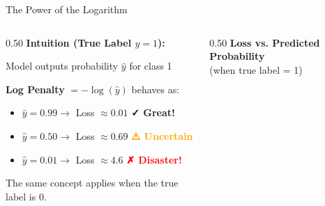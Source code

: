 \begin{frame}{The Power of the Logarithm}
    \begin{columns}[T]
        \begin{column}{0.50\textwidth}
            \textbf{Intuition (True Label $y=1$):}
            \vspace{0.5em}
            
            Model outputs probability $\hat{y}$ for class 1
            
            \vspace{0.5em}
            \textbf{Log Penalty} $= -\log(\hat{y})$ behaves as:
            \begin{itemize}
                \item $\hat{y} = 0.99 \to$ Loss $\approx 0.01$ \textcolor{green!60!black}{\textbf{✓ Great!}}
                \vspace{0.3em}
                \item $\hat{y} = 0.50 \to$ Loss $\approx 0.69$ \textcolor{orange}{\textbf{⚠️ Uncertain}}
                \vspace{0.3em}
                \item $\hat{y} = 0.01 \to$ Loss $\approx 4.6$ \textcolor{red}{\textbf{✗ Disaster!}}
            \end{itemize}
            
            \vspace{1em}
            \begin{tcolorbox}[colback=yellow!10, colframe=orange, boxsep=4pt]
                The same concept applies when the true label is 0.
            \end{tcolorbox}
        \end{column}

        \begin{column}{0.50\textwidth}
            \centering
            \textbf{Loss vs. Predicted Probability}\\
            \vspace{-0.2em}
            \small (when true label = 1)
            \vspace{0.3em}
            
\end{column}
\end{columns}
\end{frame}
